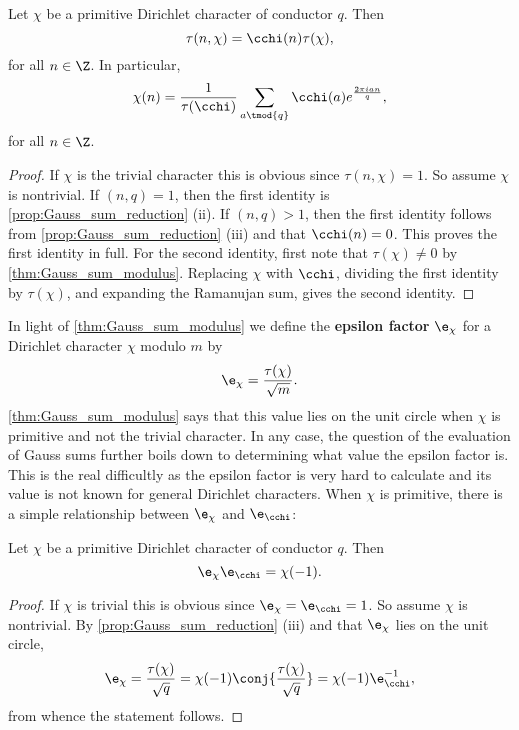         \begin{corollary}\label{cor:gauss_sum_primitive_formula}
          Let $\chi$ be a primitive Dirichlet character of conductor $q$. Then
          \[
            \tau(n,\chi) = \cchi(n)\tau(\chi),
          \]
          for all $n \in \Z$. In particular,
          \[
            \chi(n) = \frac{1}{\tau(\cchi)}\sum_{a \tmod{q}}\cchi(a)e^{\frac{2\pi ian}{q}},
          \]
          for all $n \in \Z$.
        \end{corollary}
        \begin{proof}
          If $\chi$ is the trivial character this is obvious since $\tau(n,\chi) = 1$. So assume $\chi$ is nontrivial. If $(n,q) = 1$, then the first identity is \cref{prop:Gauss_sum_reduction} (ii). If $(n,q) > 1$, then the first identity follows from \cref{prop:Gauss_sum_reduction} (iii) and that $\cchi(n) = 0$. This proves the first identity in full. For the second identity, first note that $\tau(\chi) \neq 0$ by \cref{thm:Gauss_sum_modulus}. Replacing $\chi$ with $\cchi$, dividing the first identity by $\tau(\chi)$, and expanding the Ramanujan sum, gives the second identity.
        \end{proof}

        In light of \cref{thm:Gauss_sum_modulus} we define the \textbf{epsilon factor} $\e_{\chi}$ for a Dirichlet character $\chi$ modulo $m$ by
        \[
          \e_{\chi} = \frac{\tau(\chi)}{\sqrt{m}}.
        \]
        \cref{thm:Gauss_sum_modulus} says that this value lies on the unit circle when $\chi$ is primitive and not the trivial character. In any case, the question of the evaluation of Gauss sums further boils down to determining what value the epsilon factor is. This is the real difficultly as the epsilon factor is very hard to calculate and its value is not known for general Dirichlet characters. When $\chi$ is primitive, there is a simple relationship between $\e_{\chi}$ and $\e_{\cchi}$:

        \begin{proposition}\label{prop:epsilon_factor_relationship}
          Let $\chi$ be a primitive Dirichlet character of conductor $q$. Then
          \[
            \e_{\chi}\e_{\cchi} = \chi(-1).
          \]
        \end{proposition}
        \begin{proof}
          If $\chi$ is trivial this is obvious since $\e_{\chi} = \e_{\cchi} = 1$. So assume $\chi$ is nontrivial. By \cref{prop:Gauss_sum_reduction} (iii) and that $\e_{\chi}$ lies on the unit circle,
          \[
            \e_{\chi} = \frac{\tau(\chi)}{\sqrt{q}} = \chi(-1)\conj{\frac{\tau(\chi)}{\sqrt{q}}} = \chi(-1)\e_{\cchi}^{-1},
          \]
          from whence the statement follows.
        \end{proof}
